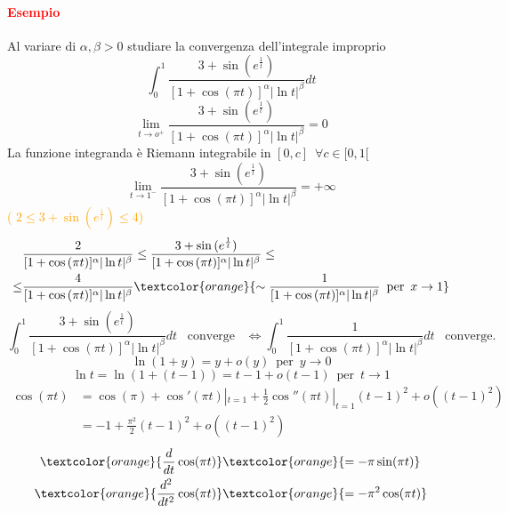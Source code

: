 \documentclass{article}
\begin{document}
\paragraph{\textcolor{red}{Esempio}}
Al variare di $\alpha,\beta > 0$ studiare la convergenza dell'integrale improprio
\begin{equation*}
    \int_{0}^{1} \frac{3+\sin{(e^{\frac{1}{t}})}}{[1+\cos{(\pi t)}]^\alpha|\ln t |^\beta}dt
\end{equation*}
\begin{equation*}
    \lim_{t \rightarrow o^+}  \frac{3+\sin{(e^{\frac{1}{t}})}}{[1+\cos{(\pi t)}]^\alpha|\ln t |^\beta} = 0
\end{equation*}
La funzione integranda è Riemann integrabile in $[0,c]\,\,\, \forall c \in [0,1[$
\begin{equation*}
    \lim_{t \rightarrow 1^-}  \frac{3+\sin{(e^{\frac{1}{t}})}}{[1+\cos{(\pi t)}]^\alpha|\ln t |^\beta} =+\infty
\end{equation*}
\textcolor{orange}{( $ 2 \leq 3+\sin{(e^{\frac{1}{t}})} \leq 4$)}
\begin{align*}
    &\frac{2}{[1+\cos{(\pi t)}]^\alpha|\ln t |^\beta} \leq  \frac{3+\sin{(e^{\frac{1}{t}})}}{[1+\cos{(\pi t)}]^\alpha|\ln t |^\beta}\leq \\ 
    \leq  &\frac{4}{[1+\cos{(\pi t)}]^\alpha|\ln t |^\beta} \textcolor{orange}{\sim  \frac{1}{[1+\cos{(\pi t)}]^\alpha|\ln t |^\beta} \,\,\, \text{per} \,\,\, x \rightarrow 1}
\end{align*}
\begin{equation*}
    \int_{0}^{1} \frac{3+\sin{(e^{\frac{1}{t}})}}{[1+\cos{(\pi t)}]^\alpha|\ln t |^\beta}dt \,\,\,\,\, \text{converge} \,\,\,\,\, \Leftrightarrow \int_{0}^{1} \frac{1}{[1+\cos{(\pi t)}]^\alpha|\ln t |^\beta}dt \,\,\,\,\, \text{converge}.
\end{equation*}
\begin{equation*}
     \ln (1+y) = y+o(y) \,\,\, \text{per} \,\,\, y \rightarrow 0 
\end{equation*}
\begin{equation*}
    \ln t =\ln(1+(t-1))=t-1+o(t-1) \,\,\, \text{per} \,\,\, t \rightarrow 1 
\end{equation*}
\begin{align*}
    \cos(\pi t)&=\cos(\pi)+\cos'(\pi t)|_{t=1}+\frac{1}{2} \cos''(\pi t)|_{t=1} (t-1)^2+ o((t-1)^2)\\ & = -1 +\frac{\pi^2}{2}(t-1)^2 + o((t-1)^2)
\end{align*}
\begin{align*}
\textcolor{orange}{
    \frac{d}{dt}\cos(\pi t)} & \textcolor{orange}{= -\pi \sin(\pi t)}\\
    \textcolor{orange}{\frac{d^2}{dt^2}\cos(\pi t)} & \textcolor{orange}{= -\pi^2 \cos(\pi t)}
\end{align*}
\end{document}
